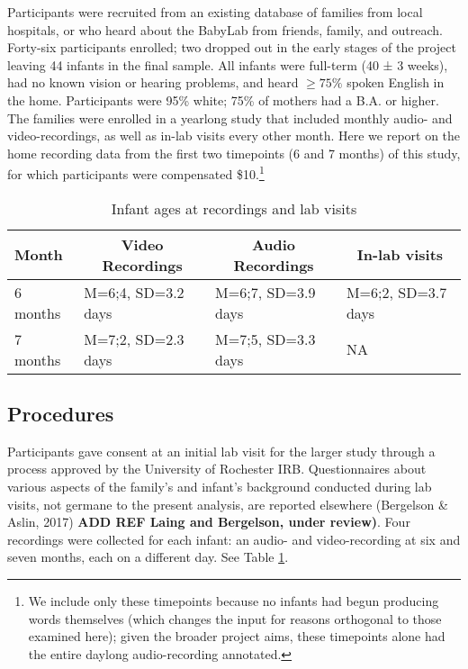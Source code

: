 \documentclass[floatsintext,man]{apa6}
\theoremstyle{definition}
\theoremstyle{definition}
\theoremstyle{definition}
\theoremstyle{remark}
\begin{document}
Participants were recruited from an existing database of families from
local hospitals, or who heard about the BabyLab from friends, family,
and outreach. Forty-six participants enrolled; two dropped out in the
early stages of the project leaving 44 infants in the final sample. All
infants were full-term (40 ± 3 weeks), had no known vision or hearing
problems, and heard \(\geq 75\%\) spoken English in the home.
Participants were 95\% white; 75\% of mothers had a B.A. or higher. The
families were enrolled in a yearlong study that included monthly audio-
and video-recordings, as well as in-lab visits every other month. Here
we report on the home recording data from the first two timepoints (6
and 7 months) of this study, for which participants were compensated
\$10.\footnote{We include only these timepoints because no infants had begun producing words themselves (which changes the input for reasons orthogonal to those examined here); given the broader project aims, these timepoints alone had the entire daylong audio-recording annotated.}

\begin{table}[b]
\begin{center}
\begin{threeparttable}
\caption{\label{tab:recording-ages-table}Infant ages at recordings and lab visits}
\begin{tabular}{llll}
\toprule
Month & \multicolumn{1}{c}{Video Recordings} & \multicolumn{1}{c}{Audio Recordings} & \multicolumn{1}{c}{In-lab visits}\\
\midrule
6 months & M=6;4, SD=3.2 days & M=6;7, SD=3.9 days & M=6;2, SD=3.7 days\\
7 months & M=7;2, SD=2.3 days & M=7;5, SD=3.3 days & NA\\
\bottomrule
\end{tabular}
\end{threeparttable}
\end{center}
\end{table}

\subsection{Procedures}\label{procedures}

Participants gave consent at an initial lab visit for the larger study
through a process approved by the University of Rochester IRB.
Questionnaires about various aspects of the family's and infant's
background conducted during lab visits, not germane to the present
analysis, are reported elsewhere (Bergelson \& Aslin, 2017) \textbf{ADD
REF Laing and Bergelson, under review)}. Four recordings were collected
for each infant: an audio- and video-recording at six and seven months,
each on a different day. See Table \ref{tab:recording-ages-table}.
\end{document}
